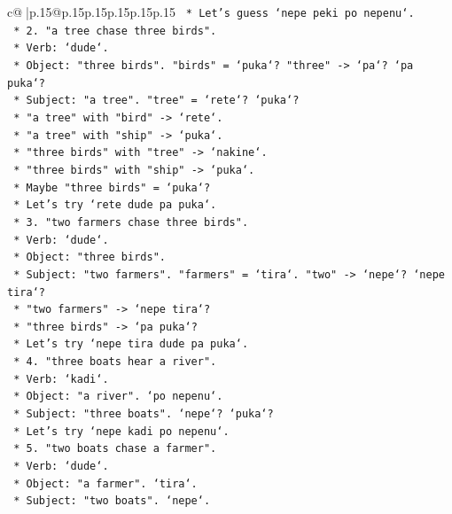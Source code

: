 \documentclass{article}
\begin{document}
{\begin{supertabular}{c@{$\;$}|p{.15\linewidth}@{}p{.15\linewidth}p{.15\linewidth}p{.15\linewidth}p{.15\linewidth}p{.15\linewidth}}
{{{\texttt{        *   Let's guess `nepe peki po nepenu`.} \\
\texttt{    *   2. "a tree chase three birds".} \\
\texttt{        *   Verb: `dude`.} \\
\texttt{        *   Object: "three birds". "birds" = `puka`? "three" {-}> `pa`? `pa puka`?} \\
\texttt{        *   Subject: "a tree". "tree" = `rete`? `puka`?} \\
\texttt{        *   "a tree" with "bird" {-}> `rete`.} \\
\texttt{        *   "a tree" with "ship" {-}> `puka`.} \\
\texttt{        *   "three birds" with "tree" {-}> `nakine`.} \\
\texttt{        *   "three birds" with "ship" {-}> `puka`.} \\
\texttt{        *   Maybe "three birds" = `puka`?} \\
\texttt{        *   Let's try `rete dude pa puka`.} \\
\texttt{    *   3. "two farmers chase three birds".} \\
\texttt{        *   Verb: `dude`.} \\
\texttt{        *   Object: "three birds".} \\
\texttt{        *   Subject: "two farmers". "farmers" = `tira`. "two" {-}> `nepe`? `nepe tira`?} \\
\texttt{        *   "two farmers" {-}> `nepe tira`?} \\
\texttt{        *   "three birds" {-}> `pa puka`?} \\
\texttt{        *   Let's try `nepe tira dude pa puka`.} \\
\texttt{    *   4. "three boats hear a river".} \\
\texttt{        *   Verb: `kadi`.} \\
\texttt{        *   Object: "a river". `po nepenu`.} \\
\texttt{        *   Subject: "three boats". `nepe`? `puka`?} \\
\texttt{        *   Let's try `nepe kadi po nepenu`.} \\
\texttt{    *   5. "two boats chase a farmer".} \\
\texttt{        *   Verb: `dude`.} \\
\texttt{        *   Object: "a farmer". `tira`.} \\
\texttt{        *   Subject: "two boats". `nepe`.} \\
}}}
\end{supertabular}}
\end{document}
